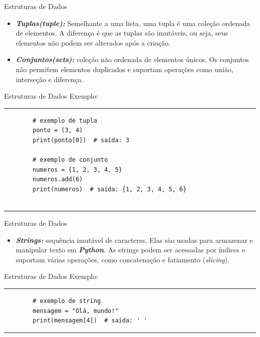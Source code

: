 \documentclass{beamer}
\begin{document}
\begin{frame}[fragile]{Estruturas de Dados}
	\begin{itemize}
		\item \textbf{\textit{Tuplas(tuple):}} Semelhante a uma lista, uma tupla é uma coleção ordenada de elementos. A diferença é que as tuplas são imutáveis, ou seja, seus elementos não podem ser alterados após a criação.
		\item \textbf{\textit{Conjuntos(sets):}} coleção não ordenada de elementos únicos. Os conjuntos não permitem elementos duplicados e suportam operações como união, interseção e diferença.
	\end{itemize}
\end{frame}

\begin{frame}[fragile]{Estruturas de Dados}
	Exemplo:
	\rule{\textwidth}{1pt}
	\scriptsize
	\begin{verbatim}
		# exemplo de tupla
		ponto = (3, 4)
		print(ponto[0])  # saída: 3
		
		# exemplo de conjunto
		numeros = {1, 2, 3, 4, 5}
		numeros.add(6)
		print(numeros)  # saída: {1, 2, 3, 4, 5, 6}
		
	\end{verbatim}
	\rule{\textwidth}{1pt}
\end{frame}

\begin{frame}[fragile]{Estruturas de Dados}
	\begin{itemize}
		\item \textbf{\textit{Strings:}} sequência imutável de caracteres. Elas são usadas para armazenar e manipular texto em \textbf{\textit{Python}}. As strings podem ser acessadas por índices e suportam várias operações, como concatenação e fatiamento (\textit{slicing}).
	\end{itemize}
\end{frame}


\begin{frame}[fragile]{Estruturas de Dados}
	Exemplo:
	\rule{\textwidth}{1pt}
	\scriptsize
	\begin{verbatim}
		# exemplo de string
		mensagem = "Olá, mundo!"
		print(mensagem[4])  # saída: ' '
	\end{verbatim}
	\rule{\textwidth}{1pt}
\end{frame}
\end{document}
